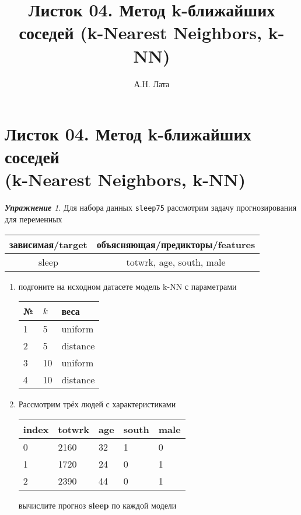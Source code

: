 \documentclass[a4,12pt]{article}
\title{Листок 04. Метод k-ближайших соседей (k-Nearest Neighbors, k-NN)}
\author{А.Н. Лата}
\theoremstyle{remark}
\newtheorem{exercise}{\textbf{Упражнение}}[section]
\begin{document}
\section*{\centering Листок 04. Метод k-ближайших соседей \\ (k-Nearest Neighbors, k-NN)}

\begin{exercise}
Для набора данных \texttt{sleep75} рассмотрим задачу прогнозирования
для переменных
\begin{center}
	\begin{tabular}{|c|c|}\hline
		зависимая/target & объясняющая/предикторы/features \\ \hline
		sleep & totwrk, age, south, male \\ \hline
	\end{tabular}
\end{center}
\begin{enumerate}
	\item подгоните на исходном датасете модель k-NN с параметрами
	\begin{center}
		\begin{tabular}{|l|l|l|}\hline
		№ & \(k\) & веса \\ \hline
		1 & 5 & uniform \\
		2 & 5 & distance \\
		3 & 10 & uniform \\
		4 & 10 & distance \\ \hline
		\end{tabular}
	\end{center}
	\item Рассмотрим трёх людей с характеристиками
	\begin{center}
		\begin{tabular}{|l||l|l|l|l|}\hline
			index & totwrk & age & south & male \\ \hline\hline
			0 & 2160 & 32 & 1 & 0 \\
			1 & 1720 & 24 & 0 & 1 \\
			2 & 2390 & 44 & 0 & 1 \\ \hline
		\end{tabular}
	\end{center}
	вычислите прогноз \textbf{sleep} по каждой модели
\end{enumerate}
\end{exercise}
\end{document}
